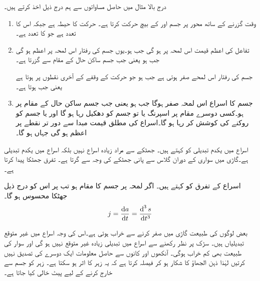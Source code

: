 درج بالا مثال میں حاصل مساواتوں سے ہم درج ذیل اخذ کرتے ہیں۔
\begin{enumerate}[1.]
\item
وقت گزرنے کے ساتھ  محور    پر جسم  اور  کے بیچ حرکت کرتا ہے۔ حرکت کا حیطہ  ہے جبکہ اس کا تعدد  ہے جو  کا  تعدد ہے۔
\item
تفاعل  کی اعظم قیمت اس لمحہ پر ہو گی جب  ہو۔یوں جسم کی رفتار  اس لمحہ پر اعظم  ہو گی جب  ہو یعنی جب جسم ساکن حال  کے مقام سے گزرتا ہے۔

جسم کی رفتار اس لمحے  صفر ہوتی ہے جب  ہو جو حرکت کے وقفے  کے آخری نقطوں پر ہوتا ہے یعنی جب  ہوتا ہے۔
\item

جسم کا اسراع  اس لمحہ صفر ہوگا جب  ہو  یعنی جب جسم ساکن حال کے مقام پر ہو۔کسی  دوسرے مقام پر اسپرنگ یا تو جسم کو دھکیل رہا ہو گا اور یا جسم  کو روکنے کی کوشش کر رہا ہو گا۔اسراع کی مطلق قیمت مبدا سے دور تر نقطے پر اعظم ہو گی
  جہاں  ہو گا۔  
\end{enumerate}

اسراع میں یکدم تبدیلی کو  کہتے ہیں۔ جھٹکے سے مراد زیادہ اسراع نہیں بلکہ  اسراع میں یکدم تبدیلی ہے۔گاڑی میں سواری کے دوران گلاس سے پانی جھٹکے  کی وجہ سے  گرتا ہے۔ تفرق  جھٹکا پیدا کرتا ہے۔

اسراع کے تفرق کو  کہتے ہیں۔ اگر لمحہ  پر  جسم کا مقام  ہو  تب  پر اس کو درج ذیل  جھٹکا  محسوس ہو گا۔
\begin{align*}
j=\frac{\dif a}{\dif t}=\frac{\dif ^{\,3}s}{\dif t^3}
\end{align*}

بعض لوگوں کی طبیعت  گاڑی میں صفر کرنے سے  خراب ہوتی ہے۔اس کی وجہ اسراع میں غیر متوقع تبدیلیاں ہیں۔ سڑک پر نظر رکھنے سے اسراع میں تبدیلی زیادہ غیر متوقع نہیں ہو گی   اور سوار کی طبیعت بھی کم خراب ہوگی۔   آنکھوں  اور کانوں سے حاصل   معلومات ایک دوسرے کی تصدیق نہیں  کرتیں لہٰذا  ذہن  الجھاؤ کا شکار ہو کر فیصلہ کرتا ہے کہ یہ زہر کا  اثر ہو سکتا ہے۔ زہر کو جسم سے خارج کرنے کے لیے پیٹ خالی  کیا جاتا ہے۔


